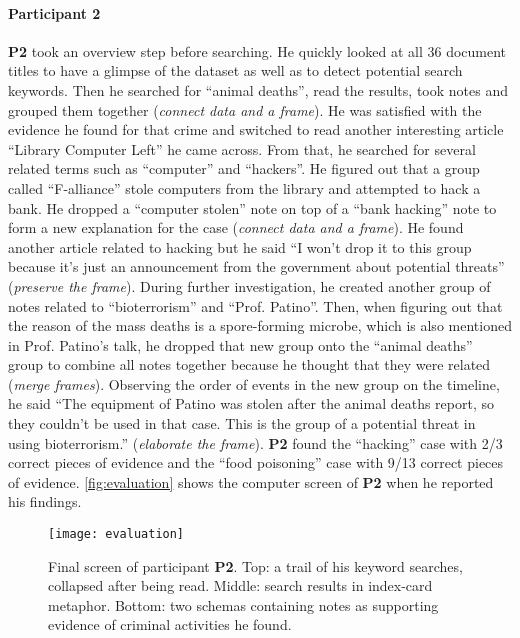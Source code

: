\paragraph{Participant 2}
\textbf{P2} took an overview step before searching. He quickly looked at all 36 document titles to have a glimpse of the dataset as well as to detect potential search keywords. Then he searched for ``animal deaths'', read the results, took notes and grouped them together (\emph{connect data and a frame}). He was satisfied with the evidence he found for that crime and switched to read another interesting article ``Library Computer Left'' he came across. From that, he searched for several related terms such as ``computer'' and ``hackers''. He figured out that a group called ``F-alliance'' stole computers from the library and attempted to hack a bank. He dropped a ``computer stolen'' note on top of a ``bank hacking'' note to form a new explanation for the case (\emph{connect data and a frame}). He found another article related to hacking but he said ``I won't drop it to this group because it's just an announcement from the government about potential threats'' (\emph{preserve the frame}). During further investigation, he created another group of notes related to ``bioterrorism'' and ``Prof. Patino''. Then, when figuring out that the reason of the mass deaths is a spore-forming microbe, which is also mentioned in Prof. Patino's talk, he dropped that new group onto the ``animal deaths'' group to combine all notes together because he thought that they were related (\emph{merge frames}). Observing the order of events in the new group on the timeline, he said ``The equipment of Patino was stolen after the animal deaths report, so they couldn't be used in that case. This is the group of a potential threat in using bioterrorism.'' (\emph{elaborate the frame}). \textbf{P2} found the ``hacking'' case with 2/3 correct pieces of evidence and the ``food poisoning'' case with 9/13 correct pieces of evidence. \autoref{fig:evaluation} shows the computer screen of \textbf{P2} when he reported his findings.

\begin{figure*}[!htb]
	\centering
	\texttt{[image: evaluation]}
	\caption{Final screen of participant \textbf{P2}. Top: a trail of his keyword searches, collapsed after being read. Middle: search results in index-card metaphor. Bottom: two schemas containing notes as supporting evidence of criminal activities he found.}
	\label{fig:evaluation}
\end{figure*}


